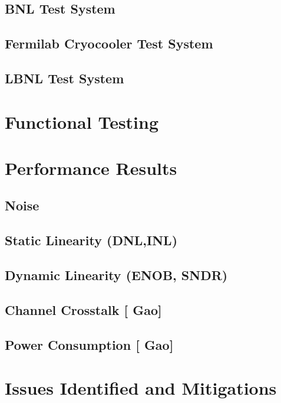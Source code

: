 \documentclass[10pt]{article}
\begin{document}
\subsection{BNL Test System }

\subsection{Fermilab Cryocooler Test System }

\subsection{LBNL Test System }


\newpage
\section{Functional Testing }


	
\newpage
\section{Performance Results}


\subsection{Noise}


\clearpage
\newpage
\subsection{Static Linearity (DNL,INL)}

\subsection{Dynamic Linearity (ENOB, SNDR)}

\clearpage
\newpage
\subsection{Channel Crosstalk [{\color{red} Gao}] }

\clearpage
\newpage
\subsection{Power Consumption [{\color{red} Gao}] }


\clearpage
\newpage
\section{Issues Identified and Mitigations}

\end{document}
